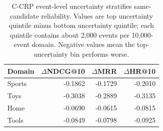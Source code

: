 \begin{table}[t]
\centering
\small
\caption{C-CRP event-level uncertainty stratifies same-candidate reliability.
Values are top uncertainty quintile minus bottom uncertainty quintile; each
quintile contains about 2,000 events per 10,000-event domain. Negative values
mean the top-uncertainty bin performs worse.}
\label{tab:uncertainty_stratification}
\begin{tabular}{lrrr}
\toprule
Domain & $\Delta$NDCG@10 & $\Delta$MRR & $\Delta$HR@10 \\
\midrule
Sports & -0.1862 & -0.1729 & -0.2010 \\
Toys & -0.3038 & -0.2889 & -0.3135 \\
Home & -0.0690 & -0.0615 & -0.0815 \\
Tools & -0.0849 & -0.0798 & -0.0925 \\
\bottomrule
\end{tabular}
\end{table}
